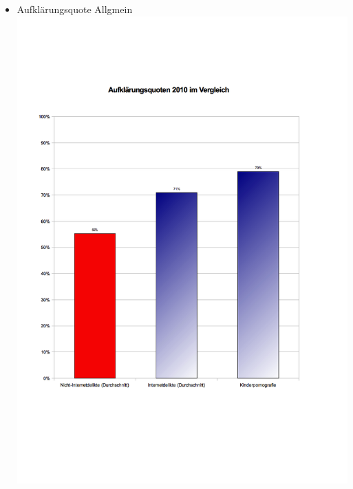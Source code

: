               \begin{frame}
\begin{itemize}
        \item Aufklärungsquote Allgmein
        \includegraphics[height=1\textheight]{sections/img/aufklaerung.png}
    \end{itemize}
    \end{frame}


